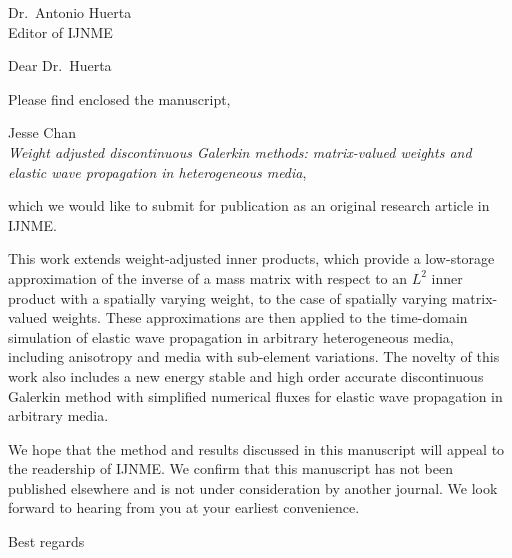 \documentclass{letter}
\begin{document}
\begin{letter}{Dr.\ Antonio Huerta\\Editor of IJNME}

\opening{Dear Dr.\ Huerta}

Please find enclosed the manuscript, 
\begin{center}
Jesse Chan\\
\textit{Weight adjusted discontinuous Galerkin methods: matrix-valued weights and elastic wave propagation in heterogeneous media},
\end{center}
which we would like to submit for publication as an original research article in IJNME.  

This work extends weight-adjusted inner products, which provide a low-storage approximation of the inverse of a mass matrix with respect to an $L^2$ inner product with a spatially varying weight, to the case of spatially varying matrix-valued weights.  These approximations are then applied to the time-domain simulation of elastic wave propagation in arbitrary heterogeneous media, including anisotropy and media with sub-element variations.  The novelty of this work also includes a new energy stable and high order accurate discontinuous Galerkin method with simplified numerical fluxes for elastic wave propagation in arbitrary media.  

We hope that the method and results discussed in this manuscript will appeal to the readership of IJNME.  We confirm that this manuscript has not been published elsewhere and is not under consideration by another journal.  We look forward to hearing from you at your earliest convenience.  

\closing{Best regards}

\end{letter}
\end{document}
